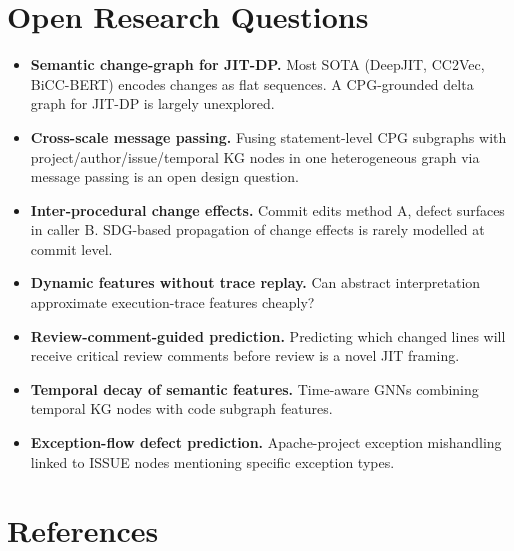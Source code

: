 \documentclass[12pt,a4paper]{article}
\begin{document}
\section{Open Research Questions}

\begin{itemize}[leftmargin=1.5em]
  \item \textbf{Semantic change-graph for JIT-DP.} Most SOTA (DeepJIT, CC2Vec,
        BiCC-BERT) encodes changes as flat sequences. A CPG-grounded delta graph
        for JIT-DP is largely unexplored.
  \item \textbf{Cross-scale message passing.} Fusing statement-level CPG
        subgraphs with project/author/issue/temporal KG nodes in one heterogeneous
        graph via message passing is an open design question.
  \item \textbf{Inter-procedural change effects.} Commit edits method A, defect
        surfaces in caller B. SDG-based propagation of change effects is rarely
        modelled at commit level.
  \item \textbf{Dynamic features without trace replay.} Can abstract
        interpretation approximate execution-trace features cheaply?
  \item \textbf{Review-comment-guided prediction.} Predicting which changed lines
        will receive critical review comments before review is a novel JIT framing.
  \item \textbf{Temporal decay of semantic features.} Time-aware GNNs combining
        temporal KG nodes with code subgraph features.
  \item \textbf{Exception-flow defect prediction.} Apache-project exception
        mishandling linked to ISSUE nodes mentioning specific exception types.
\end{itemize}

\section*{References}
\end{document}
